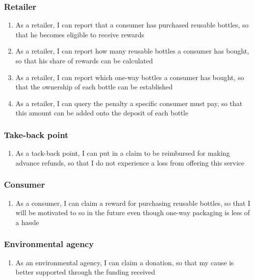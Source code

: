 \subsubsection{Retailer}
\begin{enumerate}[resume, label={\textbf{FR-\protect\twodigits{\theenumi}}},leftmargin=*]
	\item As a retailer, I can report that a consumer has purchased reusable bottles, so that he becomes eligible to receive rewards
	\item As a retailer, I can report how many reusable bottles a consumer has bought, so that his share of rewards can be calculated 
	\item As a retailer, I can report which one-way bottles a consumer has bought, so that the ownership of each bottle can be established
	\item As a retailer, I can query the penalty a specific consumer must pay, so that this amount can be added onto the deposit of each bottle
\end{enumerate}

\subsubsection{Take-back point}
\begin{enumerate}[resume, label={\textbf{FR-\protect\twodigits{\theenumi}}},leftmargin=*]
	\item As a tack-back point, I can put in a claim to be reimbursed for making advance refunds, so that I do not experience a loss from offering this service
\end{enumerate}
	
\subsubsection{Consumer}
\begin{enumerate}[resume, label={\textbf{FR-\protect\twodigits{\theenumi}}},leftmargin=*]  
	\item As a consumer, I can claim a reward for purchasing reusable bottles, so that I will be motivated to so in the future even though one-way packaging is less of a hassle
\end{enumerate}

\subsubsection{Environmental agency}
\begin{enumerate}[resume, label={\textbf{FR-\protect\twodigits{\theenumi}}},leftmargin=*]  
	\item As an environmental agency, I can claim a donation, so that my cause is better supported through the funding received
\end{enumerate}
	
